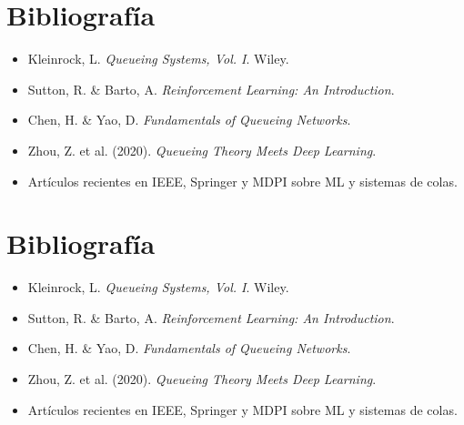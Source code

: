 \documentclass[12pt]{article}
\begin{document}
\section{Bibliografía}
\begin{itemize}
  \item Kleinrock, L. \textit{Queueing Systems, Vol. I}. Wiley.
  \item Sutton, R. \& Barto, A. \textit{Reinforcement Learning: An Introduction}.
  \item Chen, H. \& Yao, D. \textit{Fundamentals of Queueing Networks}.
  \item Zhou, Z. et al. (2020). \textit{Queueing Theory Meets Deep Learning}.
  \item Artículos recientes en IEEE, Springer y MDPI sobre ML y sistemas de colas.
\end{itemize}


\section{Bibliografía}
\begin{itemize}
  \item Kleinrock, L. \textit{Queueing Systems, Vol. I}. Wiley.
  \item Sutton, R. \& Barto, A. \textit{Reinforcement Learning: An Introduction}.
  \item Chen, H. \& Yao, D. \textit{Fundamentals of Queueing Networks}.
  \item Zhou, Z. et al. (2020). \textit{Queueing Theory Meets Deep Learning}.
  \item Artículos recientes en IEEE, Springer y MDPI sobre ML y sistemas de colas.
  
\end{itemize}
\end{document}
